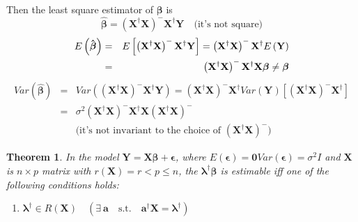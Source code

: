 \documentclass{article}
\newtheorem{theorem}{Theorem}
\begin{document}
Then the least square estimator of $\mathbf{\beta }$ is%
\begin{equation*}
\mathbf{\hat{\beta}}=\left( \mathbf{X}^{\dagger }\mathbf{X}\right) ^{-}%
\mathbf{X}^{\dagger }\mathbf{Y\quad }\text{(it's not square)}
\end{equation*}%
\begin{eqnarray*}
E\left( \mathbf{\hat{\beta}}\right) &=&E\left[ \left( \mathbf{X}^{\dagger }%
\mathbf{X}\right) ^{-}\mathbf{X}^{\dagger }\mathbf{Y}\right] =\left( \mathbf{%
X}^{\dagger }\mathbf{X}\right) ^{-}\mathbf{X}^{\dagger }E\left( \mathbf{Y}%
\right) \\
&=&\left( \mathbf{X}^{\dagger }\mathbf{X}\right) ^{-}\mathbf{X}^{\dagger }%
\mathbf{X\beta \neq \beta }
\end{eqnarray*}%
\begin{eqnarray*}
Var\left( \mathbf{\hat{\beta}}\right) &=&Var\left( \left( \mathbf{X}%
^{\dagger }\mathbf{X}\right) ^{-}\mathbf{X}^{\dagger }\mathbf{Y}\right)
=\left( \mathbf{X}^{\dagger }\mathbf{X}\right) ^{-}\mathbf{X}^{\dagger
}Var\left( \mathbf{Y}\right) \left[ \left( \mathbf{X}^{\dagger }\mathbf{X}%
\right) ^{-}\mathbf{X}^{\dagger }\right] \\
&=&\sigma ^{2}\left( \mathbf{X}^{\dagger }\mathbf{X}\right) ^{-}\mathbf{X}%
^{\dagger }\mathbf{X}\left( \mathbf{X}^{\dagger }\mathbf{X}\right) ^{-} \\
&&\text{(it's not invariant to the choice of }\left( \mathbf{X}^{\dagger }%
\mathbf{X}\right) ^{-}\text{)}
\end{eqnarray*}

\bigskip

\begin{theorem}
In the model $\mathbf{Y=X\beta +\epsilon }$, where $E\left( \mathbf{\epsilon 
}\right) =\mathbf{0}$\quad $Var\left( \mathbf{\epsilon }\right) =\sigma
^{2}I $ and $\mathbf{X}$ is $n\times p$ matrix with $r\left( \mathbf{X}%
\right) =r<p\leq n$, the $\boldsymbol{\lambda }^{\dagger }\mathbf{\beta }$
is estimable iff one of the following conditions holds:

\begin{enumerate}
\item $\boldsymbol{\lambda }^{\dagger }\in R\left( \mathbf{X}\right) \quad
\left( \exists \ \mathbf{a}\quad \text{s.t.}\quad \mathbf{a}^{\dagger }%
\mathbf{X=}\boldsymbol{\lambda }^{\dagger }\right) $
\end{enumerate}
\end{theorem}
\end{document}
